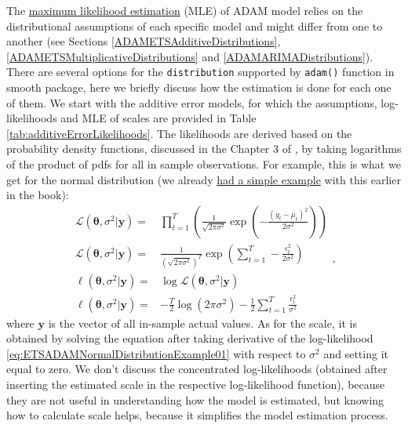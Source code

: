 \documentclass[
]{book}
\theoremstyle{definition}
\theoremstyle{definition}
\theoremstyle{definition}
\theoremstyle{definition}
\theoremstyle{remark}
\begin{document}
The \protect\hyperlink{likelihoodApproach}{maximum likelihood estimation} (MLE) of ADAM model relies on the distributional assumptions of each specific model and might differ from one to another (see Sections \ref{ADAMETSAdditiveDistributions}, \ref{ADAMETSMultiplicativeDistributions} and \ref{ADAMARIMADistributions}). There are several options for the \texttt{distribution} supported by \texttt{adam()} function in smooth package, here we briefly discuss how the estimation is done for each one of them. We start with the additive error models, for which the assumptions, log-likelihoods and MLE of scales are provided in Table \ref{tab:additiveErrorLikelihoods}. The likelihoods are derived based on the probability density functions, discussed in the Chapter 3 of \citet{SvetunkovSBA}, by taking logarithms of the product of pdfs for all in sample observations. For example, this is what we get for the normal distribution (we already \protect\hyperlink{likelihoodApproachMaths}{had a simple example} with this earlier in the book):
\begin{equation}
  \begin{aligned}
    \mathcal{L}(\boldsymbol{\theta}, {\sigma}^2 | \mathbf{y}) = & \prod_{t=1}^T \left(\frac{1}{\sqrt{2 \pi \sigma^2}} \exp \left( -\frac{\left(y_t - \mu_t \right)^2}{2 \sigma^2} \right)\right) \\
    \mathcal{L}(\boldsymbol{\theta}, {\sigma}^2 | \mathbf{y}) = & \frac{1}{\left(\sqrt{2 \pi \sigma^2}\right)^T} \exp \left( \sum_{t=1}^T -\frac{\epsilon_t^2}{2 \sigma^2} \right) \\
    \ell(\boldsymbol{\theta}, {\sigma}^2 | \mathbf{y}) = & \log \mathcal{L}(\boldsymbol{\theta}, {\sigma}^2 | \mathbf{y}) \\
    \ell(\boldsymbol{\theta}, {\sigma}^2 | \mathbf{y}) = & -\frac{T}{2} \log(2 \pi \sigma^2) -\frac{1}{2} \sum_{t=1}^T \frac{\epsilon_t^2}{\sigma^2}
  \end{aligned},
  \label{eq:ETSADAMNormalDistributionExample01}
\end{equation}
where \(\mathbf{y}\) is the vector of all in-sample actual values. As for the scale, it is obtained by solving the equation after taking derivative of the log-likelihood \eqref{eq:ETSADAMNormalDistributionExample01} with respect to \(\sigma^2\) and setting it equal to zero. We don't discuss the concentrated log-likelihoods (obtained after inserting the estimated scale in the respective log-likelihood function), because they are not useful in understanding how the model is estimated, but knowing how to calculate scale helps, because it simplifies the model estimation process.
\end{document}
